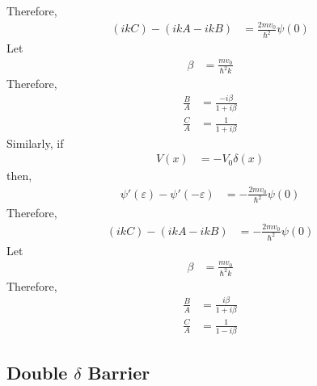 \documentclass[titlepage, fleqn, a4paper, 12pt, twoside]{article}
\theoremstyle{definition}
\theoremstyle{theorem}
\let\Oldsubsection\subsection
\renewcommand{\subsection}{\FloatBarrier\Oldsubsection}
\begin{document}
Therefore,
\begin{align*}
	(i k C) - (i k A - i k B) &= \frac{2 m v_0}{\hbar^2} \psi(0)
\end{align*}
Let
\begin{align*}
	\beta &= \frac{m v_0}{\hbar^2 k}
\end{align*}
Therefore,
\begin{align*}
	\frac{B}{A} &= \frac{-i \beta}{1 + i \beta}\\
	\frac{C}{A} &= \frac{1}{1 + i \beta}
\end{align*}
Similarly, if
\begin{align*}
	V(x) &= -V_0 \delta(x)
\end{align*}
then,
\begin{align*}
	\psi'(\varepsilon) - \psi'(-\varepsilon) &= -\frac{2 m v_0}{\hbar^2} \psi(0)
\end{align*}
Therefore,
\begin{align*}
	(i k C) - (i k A - i k B) &= -\frac{2 m v_0}{\hbar^2} \psi(0)
\end{align*}
Let
\begin{align*}
	\beta &= \frac{m v_0}{\hbar^2 k}
\end{align*}
Therefore,
\begin{align*}
	\frac{B}{A} &= \frac{i \beta}{1 + i \beta}\\
	\frac{C}{A} &= \frac{1}{1 - i \beta}
\end{align*}

\subsection{Double $\delta$ Barrier}
\end{document}
